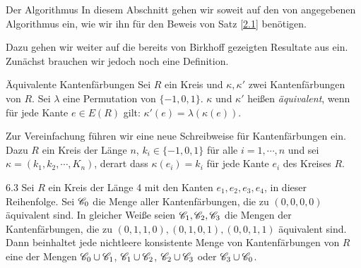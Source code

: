 \begin{section}{Der Algorithmus}
 In diesem Abschnitt gehen wir soweit auf den von \rsst angegebenen Algorithmus ein, wie wir ihn für den Beweis von Satz \ref{2.1} benötigen.
 
 Dazu gehen wir weiter auf die bereits von Birkhoff gezeigten Resultate aus \cite{AmJMath35} ein. Zunächst brauchen wir jedoch noch eine Definition.
 
 \begin{definition}{Äquivalente Kantenfärbungen}
  Sei $R$ ein Kreis und $\kappa,\kappa'$ zwei Kantenfärbungen von $R$. Sei $\lambda$ eine Permutation von $\{-1,0,1\}$. $\kappa$ und $\kappa'$ heißen \textit{äquivalent}, wenn für jede Kante $e\in E(R)$ gilt: $\kappa'(e) = \lambda(\kappa(e))$.
 \end{definition}

 Zur Vereinfachung führen wir eine neue Schreibweise für Kantenfärbungen ein. Dazu $R$ ein Kreis der Länge $n$, $k_i \in \{-1,0,1\}$ für alle $i = 1,\cdots,n$ und sei $\kappa = (k_1,k_2,\cdots,K_n)$, derart dass $\kappa(e_i) = k_i$ für jede Kante $e_i$ des Kreises $R$.
 
 \begin{lemmal}{ }{6.3}
  Sei $R$ ein Kreis der Länge 4 mit den Kanten $e_1,e_2,e_3,e_4$, in dieser Reihenfolge. Sei $\mathscr{C}_0$ die Menge aller Kantenfärbungen, die zu $(0,0,0,0)$ äquivalent sind. In gleicher Weiße seien $\mathscr{C}_1,\mathscr{C}_2,\mathscr{C}_3$ die Mengen der Kantenfärbungen, die zu $(0,1,1,0),(0,1,0,1),(0,0,1,1)$ äquivalent sind. Dann beinhaltet jede nichtleere konsistente Menge von Kantenfärbungen von $R$ eine der Mengen $\mathscr{C}_0 \cup \mathscr{C}_1$, $\mathscr{C}_1 \cup \mathscr{C}_2$, $\mathscr{C}_2 \cup \mathscr{C}_3$ oder $\mathscr{C}_3 \cup \mathscr{C}_0$.
 \end{lemmal}
 

\end{section}
